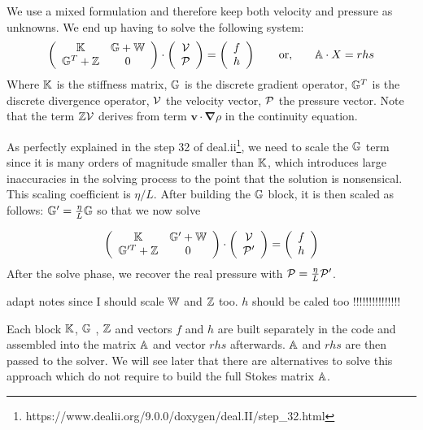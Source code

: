 We use a mixed formulation and therefore  
keep both velocity and pressure as unknowns. We end up having to solve 
the following system:
\[
\left(
\begin{array}{cc}
{\mathbb{K}} & {\mathbb{G}}+{\mathbb{W}} \\ {\mathbb{G}}^T+{\mathbb{Z}} & 0 
\end{array}
\right)
\cdot
\left(
\begin{array}{c}
{\cal V} \\ {\cal P}
\end{array}
\right)
=
\left(
\begin{array}{c}
 f \\ h
\end{array}
\right)
\quad\quad
{\rm or,}
\quad\quad
{\mathbb{A}} \cdot X = rhs
\]
Where ${\mathbb{K}}$ is the stiffness matrix, ${\mathbb{G}}$ is the discrete gradient operator, 
${\mathbb{G}}^T$ is the discrete divergence operator, ${\cal V}$ the velocity vector, 
${\cal P}$ the pressure vector.
Note that the term ${\mathbb{Z}}{\cal V}$ derives from term ${\bm v} \cdot {\bm \nabla} \rho$ in the continuity equation. 

As perfectly explained in the step 32 of deal.ii\footnote{https://www.dealii.org/9.0.0/doxygen/deal.II/step\_32.html},
we need to scale the ${\mathbb{G}}$ term since it is many orders of magnitude smaller than ${\mathbb{K}}$, which introduces large inaccuracies in the solving process to the point that the solution is nonsensical. This scaling coefficient is $\eta/L$. After building the ${\mathbb{G}}$ block, it is then scaled as follows: ${\mathbb{G}}'=\frac{\eta}{L}{\mathbb{G}}$ so that we now solve 

\[
\left(
\begin{array}{cc}
{\mathbb{K}} & {\mathbb{G}}'+{\mathbb{W}} \\ {\mathbb{G}}'^T+{\mathbb{Z}} & 0 
\end{array}
\right)
\cdot
\left(
\begin{array}{c}
{\cal V} \\ {\cal P}'
\end{array}
\right)
=
\left(
\begin{array}{c}
 f \\ h
\end{array}
\right)
\]
After the solve phase, we recover the real pressure with ${\cal P}=\frac{\eta}{L}{\cal P}'$.

{\color{red} adapt notes since I should scale ${\mathbb{W}}$ and ${\mathbb{Z}}$ too}.
{\color{red} $h$ should be caled too !!!!!!!!!!!!!!!} 

Each block ${\mathbb{K}}$, ${\mathbb{G}}$ , ${\mathbb{Z}}$ and vectors $f$ and $h$ are built separately 
in the code and assembled into 
the matrix ${\mathbb{A}}$ and vector $rhs$ afterwards. ${\mathbb{A}}$ and $rhs$ are then passed to the solver. 
We will see later that there are alternatives to solve this approach which do not require to 
build the full Stokes matrix ${\mathbb{A}}$. 

